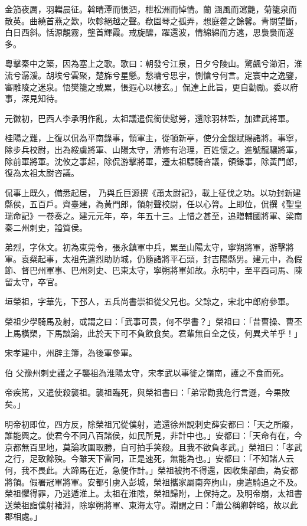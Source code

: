 \begin{pinyinscope}
 金笳夜厲，羽轊晨征。斡晴潭而悵泗，枻松洲而悼情。蘭
 涵風而瀉艷，菊籠泉而散英。曲繞首燕之歎，吹軫絕越之聲。欷園琴之孤弄，想庭藿之餘馨。青關望斷，白日西斜。恬源靚霧，壟首輝霞。戒旋醿，躍還波，情綿綿而方遠，思裊裊而遂多。



 粵擊秦中之築，因為塞上之歌。歌曰：朝發兮江泉，日夕兮陵山。驚飆兮瀄汨，淮流兮潺湲。胡埃兮雲聚，楚旆兮星懸。愁墉兮思宇，惻愴兮何言。定寰中之逸鑒，審雕陵之迷泉。悟樊籠之或累，悵遐心以棲玄。」侃達上此旨，更自勤勵。委以府事，深見知待。



 元徽初，巴西人李承明作亂，太祖議遣侃銜使慰勞，還除羽林監，加建武將軍。



 桂陽之難，上復以侃為平南錄事，領軍主，從頓新亭，使分金銀賦賜諸將。事寧，除步兵校尉，出為綏虜將軍、山陽太守，清修有治理，百姓懷之。進號龍驤將軍，除前軍將軍。沈攸之事起，除侃游擊將軍，遷太祖驃騎咨議，領錄事，除黃門郎，復為太祖太尉咨議。



 侃事上既久，備悉起居，
 乃與丘巨源撰《蕭太尉記》，載上征伐之功。以功封新建縣侯，五百戶。齊臺建，為黃門郎，領射聲校尉，任以心膂。上即位，侃撰《聖皇瑞命記》一卷奏之。建元元年，卒，年五十三。上惜之甚至，追贈輔國將軍、梁南秦二州刺史，謚質侯。



 弟烈，字休文。初為東莞令，張永鎮軍中兵，累至山陽太守，寧朔將軍，游擊將軍。袁粲起事，太祖先遣烈助防城，仍隨諸將平石頭，封吉陽縣男。建元中，為假節、督巴州軍事、巴州刺史、巴東太守，寧朔將軍如故。永明中，至平西司馬、陳留太守，卒官。



 垣榮祖，字華先，下邳人，五兵尚書崇祖從父兄也。父諒之，宋北中郎府參軍。



 榮祖少學騎馬及射，或謂之曰：「武事可畏，何不學書？」榮祖曰：「昔曹操、曹丕上馬橫槊，下馬談論，此於天下可不負飲食矣。君輩無自全之伎，何異犬羊乎！」



 宋孝建中，州辟主簿，為後軍參軍。



 伯
 父豫州刺史護之子襲祖為淮陽太守，宋孝武以事徙之嶺南，護之不食而死。



 帝疾篤，又遣使殺襲祖。襲祖臨死，與榮祖書曰：「弟常勸我危行言遜，今果敗矣。」



 明帝初即位，四方反，除榮祖冗從僕射，遣還徐州說刺史薛安都曰：「天之所廢，誰能興之。使君今不同八百諸侯，如民所見，非計中也。」安都曰：「天命有在，今京都無百里地，莫論攻圍取勝，自可拍手笑殺。且我不欲負孝武。」榮祖曰：「孝武之行，足致餘殃。今雖天下雷同，正是速死，無能為也。」安都曰：「不知諸人云何，我不畏此。大蹄馬在近，急便作計。」榮祖被拘不得還，因收集部曲，為安都將領。假署冠軍將軍。安都引虜入彭城，榮祖攜家屬南奔朐山，虜遣騎追之不及。榮祖懼得罪，乃逃遁淮上。太祖在淮陰，榮祖歸附，上保持之。及明帝崩，太祖書送榮祖詣僕射褚淵，除寧朔將軍、東海太守。淵謂之曰：「蕭公稱卿幹略，故以此郡相處。」




\end{pinyinscope}
